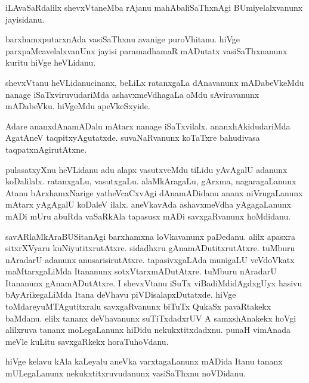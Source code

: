 \begin{mng}
iLAvaSaRdalilx shevxVtaneMba rAjanu mahAbaliSaThxnAgi BUmiyelalxvanunx jayisidanu.
\end{mng}

\begin{mng}
barxhamxputarxnAda vasiSaThxnu avanige puroVhitanu. hiVge parxpaMcavelalxvanUnx jayisi paramadhamaR mADutatx vasiSaThxnanunx kuritu hiVge heVLidanu.
\end{mng}

\begin{mng}
shevxVtanu heVLidanu\mdash cinanx, beLiLx ratanxgaLa dAnavanunx mADabeVkeMdu nanage iSaTxviruvudariMda ashavxmeVdhagaLa oMdu sAviravanunx mADabeVku. hiVgeMdu apeVkeSxyide.
\end{mng}

\begin{mng}
Adare ananxdAnamADalu mAtarx nanage iSaTxvilalx. ananxhAkidudariMda AgatAneV taqpitxyAgutatxde. suvaNaRvanunx koTaTxre bahudivasa taqpatxnAgirutAtxne.
\end{mng}

\begin{mng}
pulasatxyXnu heVLidanu \mdash adu alapx vasutxveMdu tiLidu yAvAgalU adanunx koDalilalx. ratanxgaLu, vasutxgaLu. alaMkAragaLu, gArxma, nagaragaLanunx Atanu bArxhamxNarige yatheVcaCxvAgi dAnamADidanu ananx niVrugaLanunx mAtarx yAgAgalU koDaleV ilalx. aneVkavAda ashavxmeVdha yAgagaLanunx mADi mUru abuRda vaSaRkAla tapasusx mADi savxgaRvanunx hoMdidanu.
\end{mng}

\begin{mng}
savARlaMkAraBUSitanAgi barxhamxna loVkavanunx paDedanu. alilx apasxra sitxrXVyaru kuNiyutitxrutAtxre. sidadhxru gAnamADutitxrutAtxre. tuMburu nAradarU adanunx anusarisirutAtxre. tapasivxgaLAda munigaLU veVdoVkatx maMtarxgaLiMda Itananunx sotxVtarxmADutAtxre. tuMburu nAradarU Itananunx gAnamADutAtxre. I shevxVtanu iSuTx viBadiMdidAgdxgUyx hasivu bAyArikegaLiMda Itana deVhavu piVDisalapxDutatxde. hiVge toMdareyuMTAgutitxralu savxgaRvanunx biTuTx QukaSx pavaRtakekx baMdanu. elilx tananx deVhavanunx suTiTxdadxrUV A samxshAnakekx hoVgi alilxruva tananx moLegaLanunx hiDidu nekukxtitxdadxnu. punaH vimAnada meVle kuLitu savxgaRkekx horaTuhoVdanu.
\end{mng}

\begin{mng}
hiVge kelavu kAla kaLeyalu aneVka varxtagaLanunx mADida Itanu tananx mULegaLanunx nekukxtitxruvudanunx vasiSaThxnu noVDidanu.
\end{mng}


